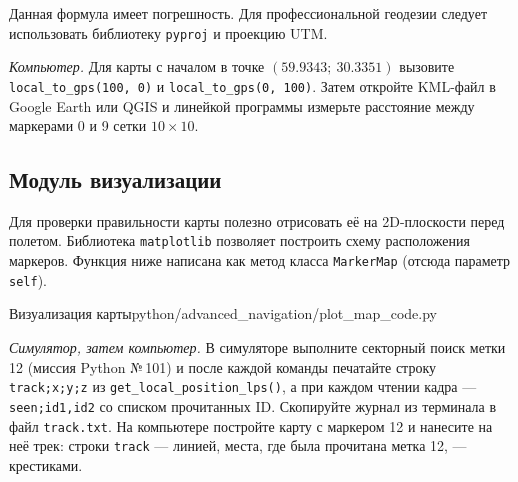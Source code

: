 \begin{warnbox}
Данная формула имеет погрешность. Для профессиональной геодезии следует использовать библиотеку \texttt{pyproj} и проекцию UTM.
\end{warnbox}

\begin{taskbox}
\emph{Компьютер.} Для карты с началом в точке $(59.9343;\ 30.3351)$ вызовите \verb|local_to_gps(100, 0)| и \verb|local_to_gps(0, 100)|. Затем откройте KML-файл в Google Earth или QGIS и линейкой программы измерьте расстояние между маркерами 0 и 9 сетки $10 \times 10$.
\end{taskbox}

\subsection{Модуль визуализации}
Для проверки правильности карты полезно отрисовать её на 2D-плоскости перед полетом. Библиотека \texttt{matplotlib} позволяет построить схему расположения маркеров. Функция ниже написана как метод класса \verb|MarkerMap| (отсюда параметр \verb|self|).

\begin{codefiletitle}[python]{Визуализация карты}{python/advanced_navigation/plot_map_code.py}
\end{codefiletitle}

\begin{taskbox}
\emph{Симулятор, затем компьютер.} В симуляторе выполните секторный поиск метки 12 (миссия Python №\,101) и после каждой команды печатайте строку \verb|track;x;y;z| из \verb|get_local_position_lps()|, а при каждом чтении кадра --- \verb|seen;id1,id2| со списком прочитанных ID. Скопируйте журнал из терминала в файл \verb|track.txt|. На компьютере постройте карту с маркером 12 и нанесите на неё трек: строки \verb|track| --- линией, места, где была прочитана метка 12, --- крестиками.
\end{taskbox}
